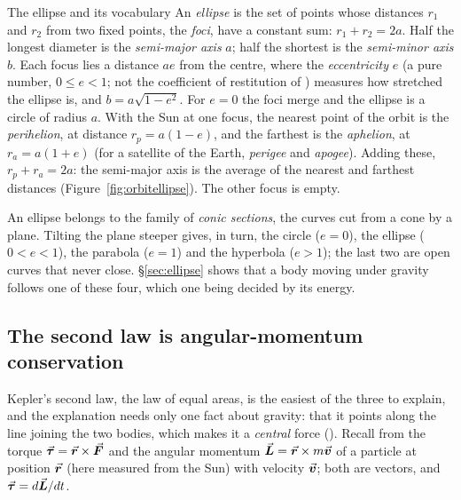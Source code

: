 \begin{defbox}{The ellipse and its vocabulary}
An \emph{ellipse} is the set of points whose distances $r_1$ and $r_2$ from two fixed points, the
\emph{foci}, have a constant sum: $r_1+r_2=2a$. Half the longest diameter is the \emph{semi-major axis}
$a$; half the shortest is the \emph{semi-minor axis} $b$. Each focus lies a distance $ae$ from the centre,
where the \emph{eccentricity} $e$ (a pure number, $0\le e<1$; not the coefficient of restitution of
) measures how stretched the ellipse is, and
$b=a\sqrt{1-e^2}$. For $e=0$ the foci merge and the ellipse is a circle of radius $a$. With the Sun at one
focus, the nearest point of the orbit is the \emph{perihelion}, at distance $r_p=a(1-e)$, and the farthest
is the \emph{aphelion}, at $r_a=a(1+e)$ (for a satellite of the Earth, \emph{perigee} and
\emph{apogee}). Adding these, $r_p+r_a=2a$: the semi-major axis is the average of the nearest and
farthest distances (Figure~\ref{fig:orbitellipse}). The other focus is empty.
\end{defbox}

\begin{figure}[htbp]
\centering
{}
\end{figure}

An ellipse belongs to the family of \emph{conic sections}, the curves cut from a cone by a plane. Tilting
the plane steeper gives, in turn, the circle ($e=0$), the ellipse ($0<e<1$), the parabola ($e=1$) and the
hyperbola ($e>1$); the last two are open curves that never close. \S\ref{sec:ellipse} shows that a body
moving under gravity follows one of these four, which one being decided by its energy.

\subsection{The second law is angular-momentum conservation}

Kepler's second law, the law of equal areas, is the easiest of the three to explain, and the explanation needs
only one fact about gravity: that it points along the line joining the two bodies, which makes it a
\emph{central} force (). Recall from  the torque
$\vec{\bm{\tau}}=\vec{\bm{r}}\times\vec{\bm{F}}$ and the angular momentum $\vec{\bm{L}}=\vec{\bm{r}}\times m\vec{\bm{v}}$ of a particle at position $\vec{\bm{r}}$ (here
measured from the Sun) with velocity $\vec{\bm{v}}$; both are vectors, and $\vec{\bm{\tau}}=d\vec{\bm{L}}/dt$.

